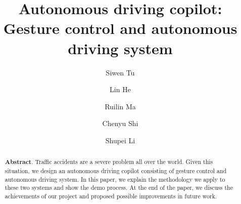 \documentclass[acmsmall]{acmart}
\begin{document}
\title{Autonomous driving copilot: Gesture control and autonomous driving system}

\author{Siwen Tu}
\author{Lin He}
\author{Ruilin Ma}
\author{Chenyu Shi}
\author{Shupei Li}


\renewcommand{\shortauthors}{S. Tu, L. He, R. Ma, C. Shi and S. Li}

\begin{abstract}
    \textbf{Abstract}. Traffic accidents are a severe problem all over the world. Given this situation, we design an autonomous driving copilot consisting of gesture control and autonomous driving system. In this paper, we explain the methodology we apply to these two systems and show the demo process. At the end of the paper, we discuss the achievements of our project and proposed possible improvements in future work.
\end{abstract}



\maketitle
\end{document}
